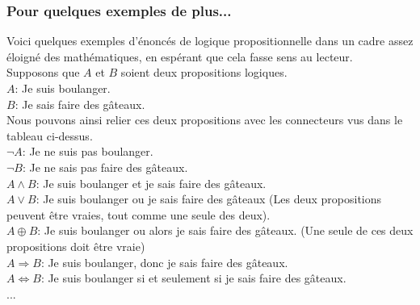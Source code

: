 \documentclass[a4paper, 12pt]{article}
\newcommand{\ffi}{\Leftrightarrow}
\newcommand{\imply}{\Rightarrow}
\numberwithin{equation}{subsection}
\begin{document}
    \subsubsection{Pour quelques exemples de plus...}
        Voici quelques exemples d'énoncés de logique propositionnelle dans un cadre assez éloigné des mathématiques, en espérant que cela fasse sens au lecteur.\\
        Supposons que $A$ et $B$ soient deux propositions logiques. \\
        $A$: Je suis boulanger. \\
        $B$: Je sais faire des gâteaux. \\
        Nous pouvons ainsi relier ces deux propositions avec les connecteurs vus dans le tableau ci-dessus. \\
        $\neg A$: Je ne suis pas boulanger. \\
        $\neg B$: Je ne sais pas faire des gâteaux. \\
        $A \land B$: Je suis boulanger et je sais faire des gâteaux. \\
        $A \lor B$: Je suis boulanger ou je sais faire des gâteaux (Les deux propositions peuvent être vraies, tout comme une seule des deux). \\
        $A \oplus B$: Je suis boulanger ou alors je sais faire des gâteaux. (Une seule de ces deux propositions doit être vraie) \\
        $A \imply B$: Je suis boulanger, donc je sais faire des gâteaux. \\
        $A \ffi B$: Je suis boulanger si et seulement si je sais faire des gâteaux. \\
        ... \\
\end{document}
